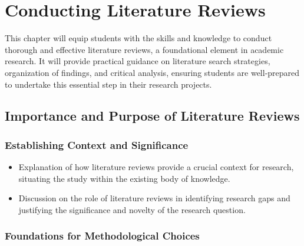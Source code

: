 \documentclass[
]{book}
\begin{document}
\hypertarget{conducting-literature-reviews}{%
\chapter*{Conducting Literature Reviews}\label{conducting-literature-reviews}}

This chapter will equip students with the skills and knowledge to conduct thorough and effective literature reviews, a foundational element in academic research. It will provide practical guidance on literature search strategies, organization of findings, and critical analysis, ensuring students are well-prepared to undertake this essential step in their research projects.

\hypertarget{importance-and-purpose-of-literature-reviews}{%
\section*{Importance and Purpose of Literature Reviews}\label{importance-and-purpose-of-literature-reviews}}

\hypertarget{establishing-context-and-significance}{%
\subsection*{Establishing Context and Significance}\label{establishing-context-and-significance}}

\begin{itemize}
\item
  Explanation of how literature reviews provide a crucial context for research, situating the study within the existing body of knowledge.
\item
  Discussion on the role of literature reviews in identifying research gaps and justifying the significance and novelty of the research question.
\end{itemize}

\hypertarget{foundations-for-methodological-choices}{%
\subsection*{Foundations for Methodological Choices}\label{foundations-for-methodological-choices}}
\end{document}
